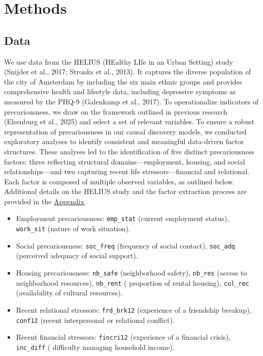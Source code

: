 \documentclass[
]{article}
\providecommand{\tightlist}{%
  \setlength{\itemsep}{0pt}\setlength{\parskip}{0pt}}\usepackage{longtable,booktabs,array}
\begin{document}
\section{Methods}\label{methods}

\subsection{Data}\label{data}

We use data from the HELIUS (HEalthy LIfe in an Urban Setting) study
(Snijder et al., 2017; Stronks et al., 2013). It captures the diverse
population of the city of Amsterdam by including the six main ethnic
groups and provides comprehensive health and lifestyle data, including
depressive symptoms as measured by the PHQ-9 (Galenkamp et al., 2017).
To operationalize indicators of precariousness, we draw on the framework
outlined in previous research (Elsenburg et al., 2025) and select a set
of relevant variables. To ensure a robust representation of
precariousness in our causal discovery models, we conducted exploratory
analyses to identify consistent and meaningful data-driven factor
structures. These analyses led to the identification of five distinct
precariousness factors: three reflecting structural
domains---employment, housing, and social relationships---and two
capturing recent life stressors---financial and relational. Each factor
is composed of multiple observed variables, as outlined below.
Additional details on the HELIUS study and the factor extraction process
are provided in the \hyperref[sec-appendix]{Appendix}.

\begin{itemize}
\tightlist
\item
  Employment precariousness: \texttt{emp\_stat} (current employment
  status), \texttt{work\_sit} (nature of work situation).
\item
  Social precariousness: \texttt{soc\_freq} (frequency of social
  contact), \texttt{soc\_adq} (perceived adequacy of social support).
\item
  Housing precariousness: \texttt{nb\_safe} (neighborhood safety),
  \texttt{nb\_res} (access to neighborhood resources), \texttt{nb\_rent}
  ( proportion of rental housing), \texttt{cul\_rec} (availability of
  cultural resources).
\item
  Recent relational stressors: \texttt{frd\_brk12} (experience of a
  friendship breakup), \texttt{conf12} (recent interpersonal or
  relational conflict).
\item
  Recent financial stressors: \texttt{fincri12} (experience of a
  financial crisis), \texttt{inc\_diff} ( difficulty managing household
  income).
\end{itemize}
\end{document}

